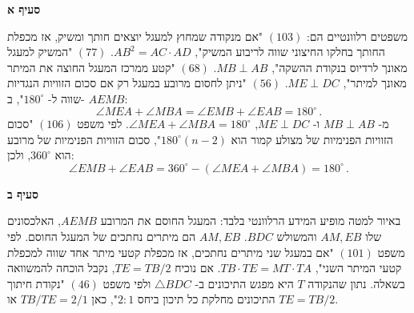 \documentclass[12pt,a4paper]{article}
\begin{document}
\vspace{-3ex}

\textbf{סעיף א}

משפטים רלוונטיים הם: 
$(103)$
"אם מנקודה שמחוץ למעגל יוצאים חותך ומשיק, אז מכפלת החותך בחלקו החיצוני שווה לריבוע המשיק",
$AB^2=AC\cdot AD$.
$(77)$
"המשיק למעגל מאונך לרדיוס בנקודת ההשקה",
$MB \perp AB$. 
$(68)$
"קטע ממרכז המעגל החוצה את המיתר מאונך למיתר",
$ME\perp DC$.
$(56)$
"ניתן לחסום מרובע במעגל רק אם סכום הזוויות הנגדיות שווה ל-%
$180^\circ$",
ב-%
$AEMB$:
\[
\angle MEA+\angle MBA=\angle EMB+\angle EAB=180^\circ\,.
\]
מ-%
$MB \perp AB$
ו-%
$ME\perp DC$,
$\angle MEA + \angle MBA = 180^\circ$.
לפי משפט
$(106)$
"סכום הזוויות הפנימיות של מצולע קמור הוא
$180^\circ(n-2)$",
סכום הזוויות הפנימיות של מרובע הוא 
$360^\circ$,
ולכן:
\[
\angle EMB + \angle EAB = 360^\circ -(\angle MEA + \angle MBA) = 180^\circ\,.
\]
\vspace{-4ex}
\begin{center}
\end{center}



\textbf{סעיף ב}

באיור למטה מופיע המידע הרלוונטי בלבד: המעגל החוסם את המרובע
$AEMB$,
האלכסונים שלו
$AM,EB$
והמשולש
$BDC$.
$AM,EB$
הם מיתרים נחתכים של המעגל החוסם. לפי משפט
$(101)$
"אם במעגל שני מיתרים נחתכים, אז מכפלת קטעי מיתר אחד שווה למכפלת קטעי המיתר השני",
$TB\cdot TE=MT\cdot TA$.
אם נוכיח
$TE=TB/2$,
נקבל הוכחה להמשוואה בשאלה.
נתון שהנקודה
$T$
היא מפגש התיכונים ב-%
$\triangle BDC$
ולפי משפט
$(46)$
"נקודת חיתוך התיכונים מחלקת כל תיכון ביחס
$2:1$",
כאן
$TB/TE=2/1$
או
$TE=TB/2$.
\end{document}
